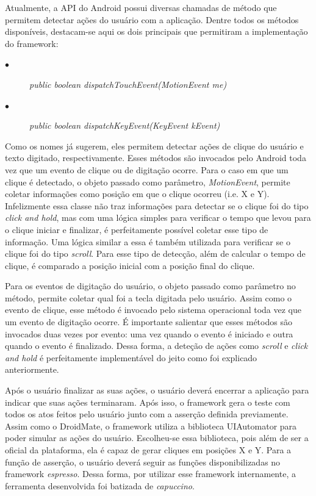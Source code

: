 \documentclass[
    12pt,       %
    openright,      %
    twoside,      %
    a4paper,      %
    english,      %
    french,       %
    spanish,      %
    brazil,       %
    ]{abntex2}
\begin{document}
        Atualmente, a API do Android possui diversas chamadas de método que permitem detectar
        ações do usuário com a aplicação. Dentre todos os métodos disponíveis, destacam-se aqui
        os dois principais que permitiram a implementação do framework: \par
        \begin{description}
          \item[$\bullet$] \textit{public boolean dispatchTouchEvent(MotionEvent me)}
          \item[$\bullet$] \textit{public boolean dispatchKeyEvent(KeyEvent kEvent)}
        \end{description}

        Como os nomes já sugerem, eles permitem detectar ações de clique do usuário
        e texto digitado, respectivamente. Esses métodos são invocados pelo Android toda
        vez que um evento de clique ou de digitação ocorre. Para o caso em que um clique
        é detectado, o objeto passado como parâmetro, \textit{MotionEvent}, permite coletar
        informações como posição em que o clique ocorreu (i.e. X e Y). Infelizmente essa classe
        não traz informações para detectar se o clique foi do tipo \textit{click and hold}, mas
        com uma lógica simples para verificar o tempo que levou para o clique iniciar e
        finalizar, é perfeitamente possível coletar esse tipo de informação. Uma lógica similar
        a essa é também utilizada para verificar se o clique foi do tipo \textit{scroll}. Para
        esse tipo de detecção, além de calcular o tempo de clique, é comparado a posição inicial
        com a posição final do clique.

        Para os eventos de digitação do usuário, o objeto passado como parâmetro no método, permite
        coletar qual foi a tecla digitada pelo usuário. Assim como o evento de clique, esse método é
        invocado pelo sistema operacional toda vez que um evento de digitação ocorre. É importante
        salientar que esses métodos são invocados duas vezes por evento: uma vez quando o evento é
        iniciado e outra quando o evento é finalizado. Dessa forma, a deteção de ações como
        \textit{scroll} e \textit{click and hold} é perfeitamente implementável do jeito como foi
        explicado anteriormente.

        Após o usuário finalizar as suas ações, o usuário deverá encerrar a aplicação para indicar
        que suas ações terminaram. Após isso, o framework gera o teste com todos os atos feitos pelo usuário
        junto com a asserção definida previamente. Assim como o DroidMate, o framework utiliza
        a biblioteca UIAutomator para poder simular as ações do usuário. Escolheu-se essa biblioteca,
        pois além de ser a oficial da plataforma, ela é capaz de gerar cliques em posições X e Y.
        Para a função de asserção, o usuário deverá seguir as funções disponibilizadas no framework
        \textit{espresso}. Dessa forma, por utilizar esse framework internamente, a ferramenta
        desenvolvida foi batizada de \textit{capuccino}.
\end{document}
